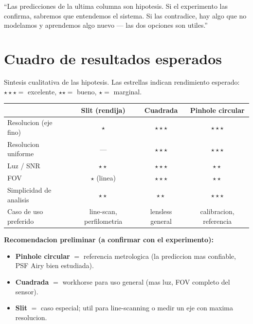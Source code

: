 \documentclass[11pt,a4paper,oneside]{report}
\begin{document}
\begin{decir}
``Las predicciones de la ultima columna son hipotesis. Si el experimento las confirma,
sabremos que entendemos el sistema. Si las contradice, hay algo que no modelamos
y aprendemos algo nuevo --- las dos opciones son utiles.''
\end{decir}

\chapter{Cuadro de resultados esperados}

Sintesis cualitativa de las hipotesis. Las estrellas indican rendimiento esperado:
$\star\star\star =$ excelente, $\star\star =$ bueno, $\star =$ marginal.

\begin{center}
\renewcommand{\arraystretch}{1.5}
\begin{tabular}{p{4cm}ccc}
\toprule
 & \textbf{Slit (rendija)} & \textbf{Cuadrada} & \textbf{Pinhole circular} \\
\midrule
Resolucion (eje fino)     & $\star$               & $\star\star\star$       & $\star\star\star$  \\
Resolucion uniforme       & ---                   & $\star\star\star$       & $\star\star\star$  \\
Luz / SNR                 & $\star\star$          & $\star\star\star$       & $\star\star$       \\
FOV                       & $\star$ (linea)       & $\star\star\star$       & $\star\star$       \\
Simplicidad de analisis   & $\star\star$          & $\star\star$            & $\star\star\star$  \\
Caso de uso preferido     & line-scan, perfilometria & lensless general & calibracion, referencia \\
\bottomrule
\end{tabular}
\end{center}

\begin{accion}
\textbf{Recomendacion preliminar (a confirmar con el experimento):}
\begin{itemize}[leftmargin=1.5em]
  \item \textbf{Pinhole circular} $=$ referencia metrologica (la prediccion mas confiable, PSF Airy bien estudiada).
  \item \textbf{Cuadrada} $=$ workhorse para uso general (mas luz, FOV completo del sensor).
  \item \textbf{Slit} $=$ caso especial; util para line-scanning o medir un eje con maxima resolucion.
\end{itemize}
\end{accion}
\end{document}
